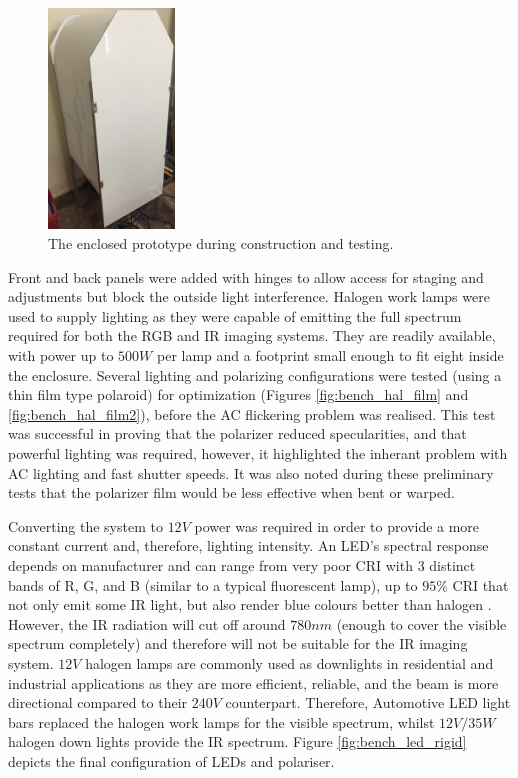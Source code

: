 \documentclass[fleqn,twoside,12pt]{report}
\begin{document}
\begin{figure}
	\begin{center}
		\includegraphics[width=0.3\textwidth]{images/bench_construct.jpg}
	\end{center}
	\caption{The enclosed prototype during construction and testing.}
	\label{fig:bench_construct}
\end{figure} 



Front and back panels were added with hinges to allow access for staging and adjustments but block the outside light interference. Halogen work lamps were used to supply lighting as they were capable of emitting the full spectrum required for both the RGB and IR imaging systems. They are readily available, with power up to $500W$ per lamp and a footprint small enough to fit eight inside the enclosure. Several lighting and polarizing configurations were tested (using a thin film type polaroid) for optimization (Figures \ref{fig:bench_hal_film} and \ref{fig:bench_hal_film2}), before the AC flickering problem was realised. This test was successful in proving that the polarizer reduced specularities, and that powerful lighting was required, however, it highlighted the inherant problem with AC lighting and fast shutter speeds. It was also noted during these preliminary tests that the polarizer film would be less effective when bent or warped. 



Converting the system to $12V$ power was required in order to provide a more constant current and, therefore, lighting intensity. An LED's spectral response depends on manufacturer and can range from very poor CRI with 3 distinct bands of R, G, and B (similar to a typical fluorescent lamp), up to $95\%$ CRI that not only emit some IR light, but also render blue colours better than halogen \cite{lumicrest}. However, the IR radiation will cut off around $780nm$ (enough to cover the visible spectrum completely) and therefore will not be suitable for the IR imaging system. $12V$ halogen lamps are commonly used as downlights in residential and industrial applications as they are more efficient, reliable, and the beam is more directional compared to their $240V$ counterpart. Therefore, Automotive LED light bars replaced the halogen work lamps for the visible spectrum, whilst $12V/35W$ halogen down lights provide the IR spectrum. Figure \ref{fig:bench_led_rigid} depicts the final configuration of LEDs and polariser.
\end{document}
